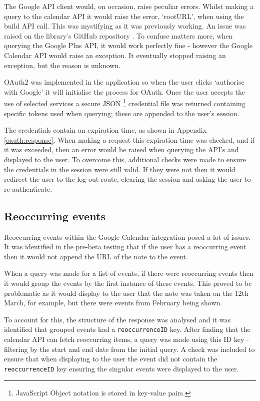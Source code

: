 {{{{{{{The Google API client would, on occasion, raise peculiar errors. Whilst making a query to the calendar API it would raise the error, `rootURL', when using the build API call. This was mystifying as it was previously working. An issue was raised on the library's GitHub repository \cite{citeulike:14021433}. To confuse matters more, when querying the Google Plus API, it would work perfectly fine - however the Google Calendar API would raise an exception. It eventually stopped raising an exception, but the reason is unknown.

OAuth2 was implemented in the application so when the user clicks `authorise with Google' it will initialise the process for OAuth.
Once the user accepts the use of selected services a secure JSON \footnote{JavaScript Object notation is stored in key-value pairs.} credential file was returned containing specific tokens used when querying; these are appended to the user's session.

The credentials contain an expiration time, as shown in Appendix \ref{oauth:response}. When making a request this expiration time was checked, and if it was exceeded, then an error would be raised when querying the API's and displayed to the user. To overcome this, additional checks were made to ensure the credentials in the session were still valid. If they were not then it would redirect the user to the log-out route, clearing the session and asking the user to re-authenticate.

\subsection{Reoccurring events}
Reoccurring events within the Google Calendar integration posed a lot of issues. It was identified in the pre-beta testing that if the user has a reoccurring event then it would not append the URL of the note to the event.

When a query was made for a list of events, if there were reoccurring events then it would group the events by the first instance of these events. This proved to be problematic as it would display to the user that the note was taken on the 12th March, for example, but there were events from February being shown.

To account for this, the structure of the response was analysed and it was identified that grouped events had a \texttt{reoccurrenceID} key. After finding that the calendar API can fetch reoccurring items, a query was made using this ID key - filtering by the start and end date from the initial query. A check was included to ensure that when displaying to the user the event did not contain the \texttt{reoccurrenceID} key ensuring the singular events were displayed to the user.

}}}}}}}
